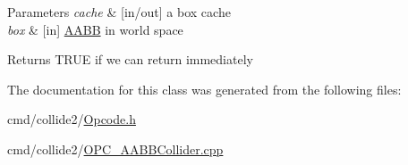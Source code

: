 \begin{DoxyParams}{Parameters}
{\em cache} & \mbox{[}in/out\mbox{]} a box cache \\
\hline
{\em box} & \mbox{[}in\mbox{]} \hyperlink{classOpcode_1_1AABB}{A\+A\+BB} in world space \\
\hline
\end{DoxyParams}
\begin{DoxyReturn}{Returns}
T\+R\+UE if we can return immediately 
\end{DoxyReturn}


The documentation for this class was generated from the following files\+:\begin{DoxyCompactItemize}
\item 
cmd/collide2/\hyperlink{Opcode_8h}{Opcode.\+h}\item 
cmd/collide2/\hyperlink{OPC__AABBCollider_8cpp}{O\+P\+C\+\_\+\+A\+A\+B\+B\+Collider.\+cpp}\end{DoxyCompactItemize}
